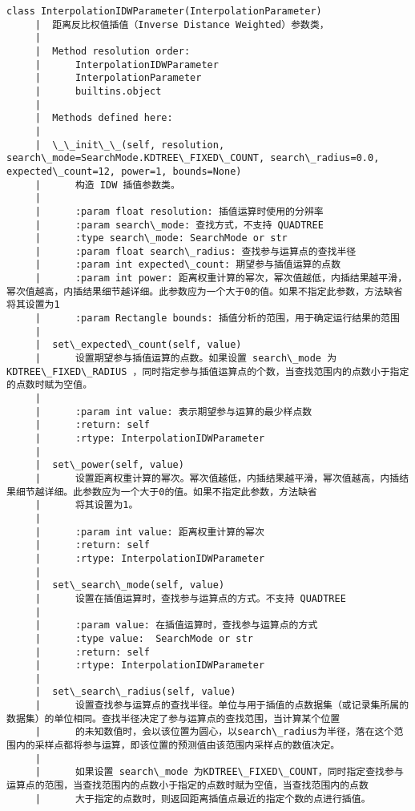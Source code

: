 \documentclass[11pt]{article}
\begin{document}
\begin{Verbatim}[commandchars=\\\{\}]
    class InterpolationIDWParameter(InterpolationParameter)
     |  距离反比权值插值（Inverse Distance Weighted）参数类，
     |  
     |  Method resolution order:
     |      InterpolationIDWParameter
     |      InterpolationParameter
     |      builtins.object
     |  
     |  Methods defined here:
     |  
     |  \_\_init\_\_(self, resolution, search\_mode=SearchMode.KDTREE\_FIXED\_COUNT, search\_radius=0.0, expected\_count=12, power=1, bounds=None)
     |      构造 IDW 插值参数类。
     |      
     |      :param float resolution: 插值运算时使用的分辨率
     |      :param search\_mode: 查找方式，不支持 QUADTREE
     |      :type search\_mode: SearchMode or str
     |      :param float search\_radius: 查找参与运算点的查找半径
     |      :param int expected\_count: 期望参与插值运算的点数
     |      :param int power: 距离权重计算的幂次，幂次值越低，内插结果越平滑，幂次值越高，内插结果细节越详细。此参数应为一个大于0的值。如果不指定此参数，方法缺省将其设置为1
     |      :param Rectangle bounds: 插值分析的范围，用于确定运行结果的范围
     |  
     |  set\_expected\_count(self, value)
     |      设置期望参与插值运算的点数。如果设置 search\_mode 为 KDTREE\_FIXED\_RADIUS ，同时指定参与插值运算点的个数，当查找范围内的点数小于指定的点数时赋为空值。
     |      
     |      :param int value: 表示期望参与运算的最少样点数
     |      :return: self
     |      :rtype: InterpolationIDWParameter
     |  
     |  set\_power(self, value)
     |      设置距离权重计算的幂次。幂次值越低，内插结果越平滑，幂次值越高，内插结果细节越详细。此参数应为一个大于0的值。如果不指定此参数，方法缺省
     |      将其设置为1。
     |      
     |      :param int value: 距离权重计算的幂次
     |      :return: self
     |      :rtype: InterpolationIDWParameter
     |  
     |  set\_search\_mode(self, value)
     |      设置在插值运算时，查找参与运算点的方式。不支持 QUADTREE
     |      
     |      :param value: 在插值运算时，查找参与运算点的方式
     |      :type value:  SearchMode or str
     |      :return: self
     |      :rtype: InterpolationIDWParameter
     |  
     |  set\_search\_radius(self, value)
     |      设置查找参与运算点的查找半径。单位与用于插值的点数据集（或记录集所属的数据集）的单位相同。查找半径决定了参与运算点的查找范围，当计算某个位置
     |      的未知数值时，会以该位置为圆心，以search\_radius为半径，落在这个范围内的采样点都将参与运算，即该位置的预测值由该范围内采样点的数值决定。
     |      
     |      如果设置 search\_mode 为KDTREE\_FIXED\_COUNT，同时指定查找参与运算点的范围，当查找范围内的点数小于指定的点数时赋为空值，当查找范围内的点数
     |      大于指定的点数时，则返回距离插值点最近的指定个数的点进行插值。

\end{Verbatim}
\end{document}
